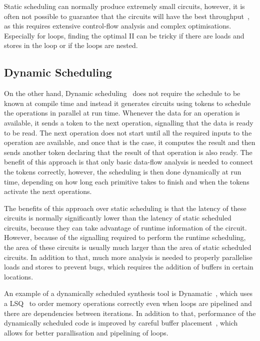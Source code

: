 Static scheduling can normally produce extremely small circuits, however, it is
often not possible to guarantee that the circuits will have the best
throughput~\cite{cheng20_combin_dynam_static_sched_high_level_synth}, as this
requires extensive control-flow analysis and complex optimisations.  Especially
for loops, finding the optimal \gls{II} can be tricky if there are loads and
stores in the loop or if the loops are nested.

\subsection{Dynamic Scheduling}%
\label{sec:bg:dynamic-scheduling}

On the other hand, Dynamic
scheduling~\cite{josipovic18_dynam_sched_high_level_synth} does not require the
schedule to be known at compile time and instead it generates circuits using
tokens to schedule the operations in parallel at run time.  Whenever the data
for an operation is available, it sends a token to the next operation,
signalling that the data is ready to be read.  The next operation does not start
until all the required inputs to the operation are available, and once that is
the case, it computes the result and then sends another token declaring that the
result of that operation is also ready.  The benefit of this approach is that
only basic data-flow analysis is needed to connect the tokens correctly,
however, the scheduling is then done dynamically at run time, depending on how
long each primitive takes to finish and when the tokens activate the next
operations.

The benefits of this approach over static scheduling is that the latency of
these circuits is normally significantly lower than the latency of static
scheduled circuits, because they can take advantage of runtime information of
the circuit.  However, because of the signalling required to perform the runtime
scheduling, the area of these circuits is usually much larger than the area of
static scheduled circuits.  In addition to that, much more analysis is needed to
properly parallelise loads and stores to prevent bugs, which requires the
addition of buffers in certain locations.

An example of a dynamically scheduled synthesis tool is
Dynamatic~\cite{josipović18_dynam_sched_high_synth}, which uses a
\gls{LSQ}~\cite{josipovic17_out_of_order_load_store} to order memory operations
correctly even when loops are pipelined and there are dependencies between
iterations.  In addition to that, performance of the dynamically scheduled code
is improved by careful buffer
placement~\cite{josipovic20_buffer_placem_sizin_high_perfor_dataf_circuit},
which allows for better parallisation and pipelining of loops.

